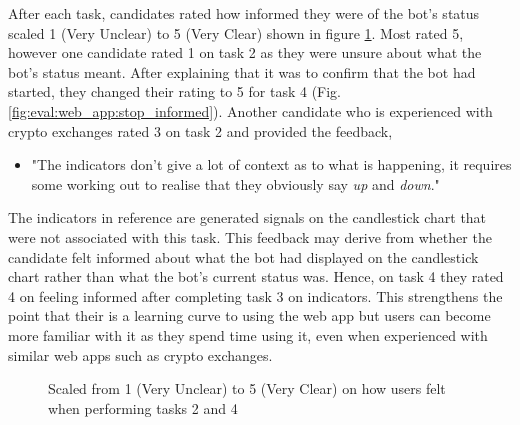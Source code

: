 After each task, candidates rated how informed they were of the bot's status scaled 1 (Very Unclear) to 5 (Very Clear) shown in figure \ref{fig:eval:web_app:start_stop_informed}. Most rated 5, however one candidate rated 1 on task 2 as they were unsure about what the bot's status meant. After explaining that it was to confirm that the bot had started, they changed their rating to 5 for task 4 (Fig. \ref{fig:eval:web_app:stop_informed}). Another candidate who is experienced with crypto exchanges rated 3 on task 2 and provided the feedback,  
\begin{itemize}
\item "The indicators don't give a lot of context as to what is happening, it requires some working out to realise that they obviously say \textit{up} and \textit{down}." 
\end{itemize}
The indicators in reference are generated signals on the candlestick chart that were not associated with this task. This feedback may derive from whether the candidate felt informed about what the bot had displayed on the candlestick chart rather than what the bot's current status was. Hence, on task 4 they rated 4 on feeling informed after completing task 3 on indicators. This strengthens the point that their is a learning curve to using the web app but users can become more familiar with it as they spend time using it, even when experienced with similar web apps such as crypto exchanges.

\begin{figure}[ht]
  \centering
  \hfill
  \caption{Scaled from 1 (Very Unclear) to 5 (Very Clear) on how users felt when performing tasks 2 and 4}
  \label{fig:eval:web_app:start_stop_informed}
\end{figure}

